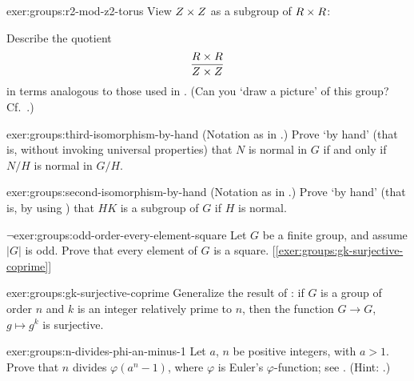 \begin{exer}{}{exer:groups:r2-mod-z2-torus}
  View $Z \times Z$ as a subgroup of $R \times R$:
  \begin{center}
  \end{center}
  Describe the quotient
  \[
    \frac{R \times R}{Z \times Z}
  \]
  in terms analogous to those used in
  .  (Can you `draw a
  picture' of this group? Cf.\ .)
\end{exer}
\begin{exer}{}{exer:groups:third-isomorphism-by-hand}
  (Notation as in
  .)  Prove `by
  hand' (that is, without invoking universal properties) that $N$ is
  normal in $G$ if and only if $N/H$ is normal in $G/H$.
\end{exer}
\begin{exer}{}{exer:groups:second-isomorphism-by-hand}
  (Notation as in
  .)  Prove
  `by hand' (that is, by using
  ) that $HK$ is a
  subgroup of $G$ if $H$ is normal.
\end{exer}
\begin{exer}{$\lnot$}{exer:groups:odd-order-every-element-square}
  Let $G$ be a finite group, and assume $|G|$ is odd. Prove that every
  element of $G$ is a
  square. [\ref{exer:groups:gk-surjective-coprime}]
\end{exer}
\begin{exer}{}{exer:groups:gk-surjective-coprime}
  Generalize the result of
  : if $G$ is a group
  of order $n$ and $k$ is an integer relatively prime to $n$, then the
  function $G \to G$, $g \mapsto g^k$ is surjective.
\end{exer}
\begin{exer}{}{exer:groups:n-divides-phi-an-minus-1}
  Let $a$, $n$ be positive integers, with $a > 1$. Prove that $n$
  divides $\varphi(a^n-1)$, where $\varphi$ is Euler's
  $\varphi$-function; see
  . (Hint:
  .)
\end{exer}
